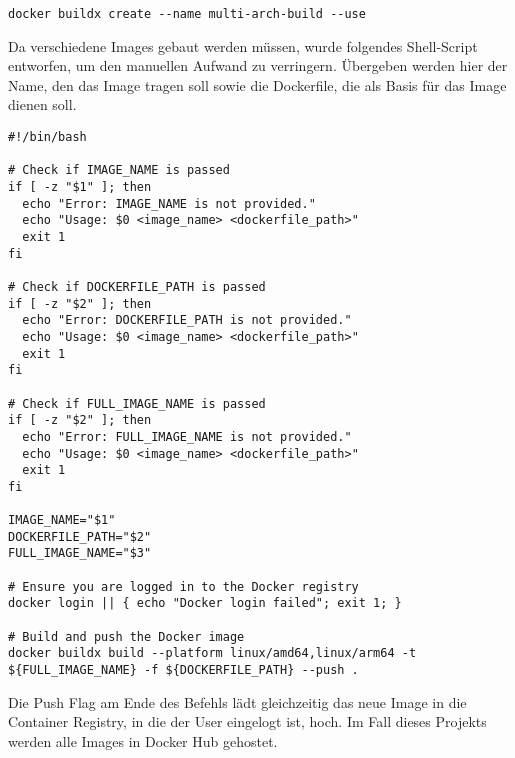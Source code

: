 \vspace{1em}
\begin{lstlisting}[label={lst:lst-shell-buildx-setup}]
docker buildx create --name multi-arch-build --use
\end{lstlisting}
\vspace{1em}

Da verschiedene Images gebaut werden müssen, wurde folgendes Shell-Script entworfen, um den manuellen Aufwand zu verringern.
Übergeben werden hier der Name, den das Image tragen soll sowie die Dockerfile, die als Basis für das Image dienen soll.

\vspace{1em}
\begin{lstlisting}[label={lst:lst-shell-buildx-build}]
#!/bin/bash

# Check if IMAGE_NAME is passed
if [ -z "$1" ]; then
  echo "Error: IMAGE_NAME is not provided."
  echo "Usage: $0 <image_name> <dockerfile_path>"
  exit 1
fi

# Check if DOCKERFILE_PATH is passed
if [ -z "$2" ]; then
  echo "Error: DOCKERFILE_PATH is not provided."
  echo "Usage: $0 <image_name> <dockerfile_path>"
  exit 1
fi

# Check if FULL_IMAGE_NAME is passed
if [ -z "$2" ]; then
  echo "Error: FULL_IMAGE_NAME is not provided."
  echo "Usage: $0 <image_name> <dockerfile_path>"
  exit 1
fi

IMAGE_NAME="$1"
DOCKERFILE_PATH="$2"
FULL_IMAGE_NAME="$3"

# Ensure you are logged in to the Docker registry
docker login || { echo "Docker login failed"; exit 1; }

# Build and push the Docker image
docker buildx build --platform linux/amd64,linux/arm64 -t ${FULL_IMAGE_NAME} -f ${DOCKERFILE_PATH} --push .
\end{lstlisting}
\vspace{1em}

Die Push Flag am Ende des Befehls lädt gleichzeitig das neue Image in die Container Registry, in die der User eingelogt ist, hoch.
Im Fall dieses Projekts werden alle Images in Docker Hub gehostet.

